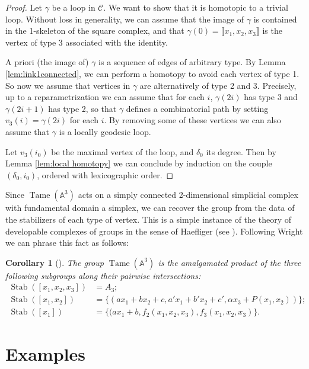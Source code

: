 \documentclass[reqno,oneside,11pt]{amsart}
\theoremstyle{plain}
\newtheorem{corollary}[theorem]{Corollary}
\theoremstyle{definition}
\newcommand{\A}{{\mathbb{A}}}
\DeclareMathOperator{\Stab}{Stab}
\DeclareMathOperator{\Tame}{Tame}
\newcommand{\Comp}{\mathcal{C}}
\newcommand{\TA}{\Tame(\A^3)}
\newcommand{\llb}{\llbracket}
\newcommand{\rrb}{\rrbracket}
\begin{document}
\begin{proof}
Let $\gamma$ be a loop in $\Comp$. We want to show that it is homotopic to a trivial loop.
Without loss in generality, we can assume that the image of $\gamma$ is contained in the 1-skeleton of the square complex, and that $\gamma(0) = \llb x_1,x_2,x_3 \rrb$ is the vertex of type 3 associated with the identity.

A priori (the image of) $\gamma$ is a sequence of edges of arbitrary type.
By Lemma \ref{lem:link1connected}, we can perform a homotopy to avoid each vertex of type 1.
So now we assume that vertices in $\gamma$ are alternatively of type 2 and 3.
Precisely, up to a reparametrization we can assume that for each $i$, $\gamma(2i)$ has type 3 and $\gamma(2i+1)$ has type 2, so that $\gamma$ defines a combinatorial path by setting $v_3(i) = \gamma(2i)$ for each $i$.
By removing some of these vertices we can also assume that $\gamma$ is a locally geodesic loop.

Let $v_3(i_0)$ be the maximal vertex of the loop, and $\delta_0$ its degree.
Then by Lemma \ref{lem:local homotopy} we can conclude by induction on the couple $(\delta_0, i_0)$, ordered with lexicographic order.
\end{proof}

Since $\TA$ acts on a simply connected 2-dimensional simplicial complex with fundamental domain a simplex, we can recover the group from the data of the stabilizers of each type of vertex.
This is a simple instance of the theory of developable complexes of groups in the sense of Haefliger (see \cite[III.$\mathcal C$]{BH}).
Following Wright we can phrase this fact as follows:

\begin{corollary}[{\cite[Theorem 2]{wright}}] \label{cor:product}
The group $\TA$ is the amalgamated product of the three following subgroups along their pairwise intersections:
\begin{align*}
\Stab([x_1, x_2, x_3]) &= A_3; \\
\Stab([x_1,x_2]) &= \{(ax_1 + bx_2 + c, a'x_1 + b'x_2 + c', \alpha x_3 + P(x_1, x_2))\}; \\
\Stab([x_1]) &= \{(ax_1 + b, f_2(x_1, x_2, x_3), f_3(x_1, x_2, x_3) \}.
\end{align*}

\end{corollary}

\section{Examples} \label{sec:examples}
\end{document}
